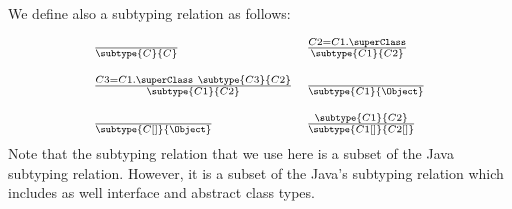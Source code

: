 We define also a subtyping relation as follows:

$$\begin{array}{ll}
  \frac{}{ \subtype{C}{C}} &  
  \frac{   C2 = C1.\superClass  }{\subtype{C1}{C2}} \\  
  & \\
  \frac{ C3 = C1.\superClass \   \subtype{C3}{C2} }{ \subtype{C1}{C2} } &
  \frac{}{  \subtype{C1}{\Object}} \\
  & \\
  \frac{   }{\subtype{C[]}{\Object}} &  
  \frac{ \subtype{C1}{C2}}{\subtype{C1[]}{C2[]}} \\
  \end{array}$$
Note that the subtyping relation that we use here is a subset of the Java subtyping relation. However, it is a subset of
the Java's subtyping relation which includes as well interface and abstract class types.
